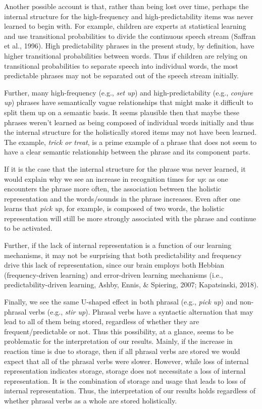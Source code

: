 \documentclass[
  man,floatsintext]{apa6}
\begin{document}
Another possible account is that, rather than being lost over time, perhaps the internal structure for the high-frequency and high-predictability items was never learned to begin with. For example, children are experts at statistical learning and use transitional probabilities to divide the continuous speech stream (Saffran et al., 1996). High predictability phrases in the present study, by definition, have higher transitional probabilities between words. Thus if children are relying on transitional probabilities to separate speech into individual words, the most predictable phrases may not be separated out of the speech stream initially.

Further, many high-frequency (e.g., \emph{set up}) and high-predictability (e.g., \emph{conjure up}) phrases have semantically vague relationships that might make it difficult to split them up on a semantic basis. It seems plausible then that maybe these phrases weren't learned as being composed of individual words initially and thus the internal structure for the holistically stored items may not have been learned. The example, \emph{trick or treat}, is a prime example of a phrase that does not seem to have a clear semantic relationship between the phrase and its component parts.

If it is the case that the internal structure for the phrase was never learned, it would explain why we see an increase in recognition times for \emph{up}: as one encounters the phrase more often, the association between the holistic representation and the words/sounds in the phrase increases. Even after one learns that \emph{pick up}, for example, is composed of two words, the holistic representation will still be more strongly associated with the phrase and continue to be activated.

Further, if the lack of internal representation is a function of our learning mechanisms, it may not be surprising that both predictability and frequency drive this lack of representation, since our brain employs both Hebbian (frequency-driven learning) and error-driven learning mechanisms (i.e., predictability-driven learning, Ashby, Ennis, \& Spiering, 2007; Kapatsinski, 2018).

Finally, we see the same U-shaped effect in both phrasal (e.g., \emph{pick up}) and non-phrasal verbs (e.g., \emph{stir up}). Phrasal verbs have a syntactic alternation that may lead to all of them being stored, regardless of whether they are frequent/predictable or not. Thus this possibility, at a glance, seems to be problematic for the interpretation of our results. Mainly, if the increase in reaction time is due to storage, then if all phrasal verbs are stored we would expect that all of the phrasal verbs were slower. However, while loss of internal representation indicates storage, storage does not necessitate a loss of internal representation. It is the combination of storage and usage that leads to loss of internal representation. Thus, the interpretation of our results holds regardless of whether phrasal verbs as a whole are stored holistically.
\end{document}

